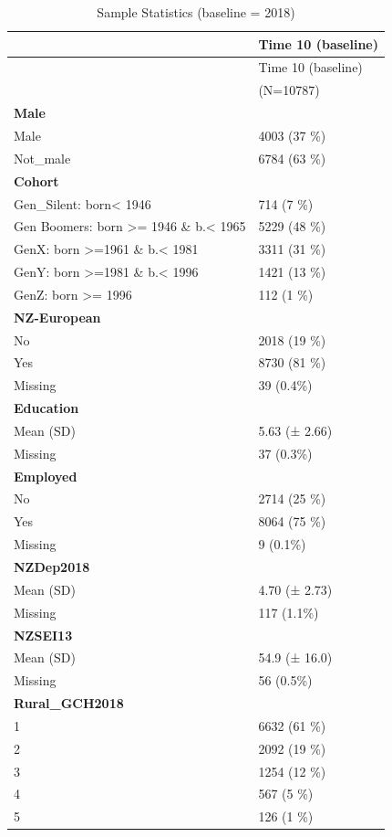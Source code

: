 \documentclass[
  singlecolumn]{report}
\begin{document}
\hypertarget{tbl-sample}{}
\begin{longtable}[]{@{}ll@{}}
\caption{\label{tbl-sample}Sample Statistics (baseline =
2018)}\tabularnewline
\toprule()
& Time 10 (baseline) \\
\midrule()
\endfirsthead
\toprule()
& Time 10 (baseline) \\
\midrule()
\endhead
& (N=10787) \\
\textbf{Male} & \\
Male & 4003 (37 \%) \\
Not\_male & 6784 (63 \%) \\
\textbf{Cohort} & \\
Gen\_Silent: born\textless{} 1946 & 714 (7 \%) \\
Gen Boomers: born \textgreater= 1946 \& b.\textless{} 1965 & 5229 (48
\%) \\
GenX: born \textgreater=1961 \& b.\textless{} 1981 & 3311 (31 \%) \\
GenY: born \textgreater=1981 \& b.\textless{} 1996 & 1421 (13 \%) \\
GenZ: born \textgreater= 1996 & 112 (1 \%) \\
\textbf{NZ-European} & \\
No & 2018 (19 \%) \\
Yes & 8730 (81 \%) \\
Missing & 39 (0.4\%) \\
\textbf{Education} & \\
Mean (SD) & 5.63 (± 2.66) \\
Missing & 37 (0.3\%) \\
\textbf{Employed} & \\
No & 2714 (25 \%) \\
Yes & 8064 (75 \%) \\
Missing & 9 (0.1\%) \\
\textbf{NZDep2018} & \\
Mean (SD) & 4.70 (± 2.73) \\
Missing & 117 (1.1\%) \\
\textbf{NZSEI13} & \\
Mean (SD) & 54.9 (± 16.0) \\
Missing & 56 (0.5\%) \\
\textbf{Rural\_GCH2018} & \\
1 & 6632 (61 \%) \\
2 & 2092 (19 \%) \\
3 & 1254 (12 \%) \\
4 & 567 (5 \%) \\
5 & 126 (1 \%) \\

\end{longtable}
\end{document}
